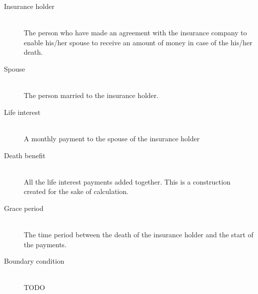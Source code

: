 \begin{description}
	\item[Insurance holder] \hfill \\
	The person who have made an agreement with the insurance company to enable his/her spouse to receive an amount of money in case of the his/her death.
	\item[Spouse] \hfill \\
	The person married to the insurance holder.
	\item[Life interest] \hfill \\
	A monthly payment to the spouse of the insurance holder
	\item[Death benefit] \hfill \\
	All the life interest payments added together. This is a construction created for the sake of calculation. 
	\item[Grace period] \hfill \\
	The time period between the death of the insurance holder and the start of the payments. 
	\item[Boundary condition] \hfill \\
	TODO
\end{description}
